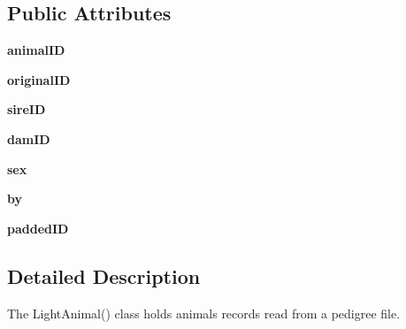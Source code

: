 \subsection*{Public Attributes}
\begin{DoxyCompactItemize}
\item 
\hypertarget{classPyPedal_1_1pyp__newclasses_1_1LightAnimal_ac7252021cdf147762d17572797a2b5bf}{
{\bfseries animalID}}
\label{classPyPedal_1_1pyp__newclasses_1_1LightAnimal_ac7252021cdf147762d17572797a2b5bf}

\item 
\hypertarget{classPyPedal_1_1pyp__newclasses_1_1LightAnimal_aa47f85c83443cdf72d9a036168bd40c3}{
{\bfseries originalID}}
\label{classPyPedal_1_1pyp__newclasses_1_1LightAnimal_aa47f85c83443cdf72d9a036168bd40c3}

\item 
\hypertarget{classPyPedal_1_1pyp__newclasses_1_1LightAnimal_a6ebb45411e7cedae72bf6a127a43402f}{
{\bfseries sireID}}
\label{classPyPedal_1_1pyp__newclasses_1_1LightAnimal_a6ebb45411e7cedae72bf6a127a43402f}

\item 
\hypertarget{classPyPedal_1_1pyp__newclasses_1_1LightAnimal_a1ac2bcd5c8dddbacf7ffb61e63b88f68}{
{\bfseries damID}}
\label{classPyPedal_1_1pyp__newclasses_1_1LightAnimal_a1ac2bcd5c8dddbacf7ffb61e63b88f68}

\item 
\hypertarget{classPyPedal_1_1pyp__newclasses_1_1LightAnimal_a32ff34221d6b6b1033706e4a5d01a496}{
{\bfseries sex}}
\label{classPyPedal_1_1pyp__newclasses_1_1LightAnimal_a32ff34221d6b6b1033706e4a5d01a496}

\item 
\hypertarget{classPyPedal_1_1pyp__newclasses_1_1LightAnimal_ab1e4345cde35a5012b119396abba4df4}{
{\bfseries by}}
\label{classPyPedal_1_1pyp__newclasses_1_1LightAnimal_ab1e4345cde35a5012b119396abba4df4}

\item 
\hypertarget{classPyPedal_1_1pyp__newclasses_1_1LightAnimal_ae64f455e9df40a235a8c09f5fdf13dc0}{
{\bfseries paddedID}}
\label{classPyPedal_1_1pyp__newclasses_1_1LightAnimal_ae64f455e9df40a235a8c09f5fdf13dc0}

\end{DoxyCompactItemize}


\subsection{Detailed Description}
The LightAnimal() class holds animals records read from a pedigree file. 

